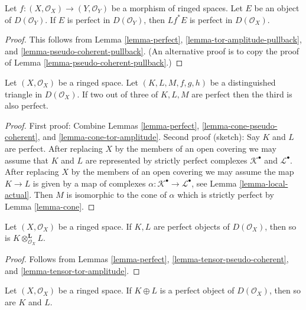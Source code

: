 \begin{lemma}
\label{lemma-perfect-pullback}
Let $f : (X, \mathcal{O}_X) \to (Y, \mathcal{O}_Y)$ be a morphism of ringed
spaces. Let $E$ be an object of $D(\mathcal{O}_Y)$. If $E$ is perfect in
$D(\mathcal{O}_Y)$, then $Lf^*E$ is perfect in $D(\mathcal{O}_X)$.
\end{lemma}

\begin{proof}
This follows from Lemma \ref{lemma-perfect},
\ref{lemma-tor-amplitude-pullback}, and
\ref{lemma-pseudo-coherent-pullback}.
(An alternative proof is to copy the proof of
Lemma \ref{lemma-pseudo-coherent-pullback}.)
\end{proof}

\begin{lemma}
\label{lemma-two-out-of-three-perfect}
Let $(X, \mathcal{O}_X)$ be a ringed space. Let $(K, L, M, f, g, h)$
be a distinguished triangle in $D(\mathcal{O}_X)$. If two out of three of
$K, L, M$ are perfect then the third is also perfect.
\end{lemma}

\begin{proof}
First proof: Combine
Lemmas \ref{lemma-perfect}, \ref{lemma-cone-pseudo-coherent}, and
\ref{lemma-cone-tor-amplitude}.
Second proof (sketch): Say $K$ and $L$ are perfect. After replacing
$X$ by the members of an open covering we may assume that $K$ and $L$
are represented by strictly perfect complexes $\mathcal{K}^\bullet$
and $\mathcal{L}^\bullet$. After replacing $X$ by the members
of an open covering we may assume the map $K \to L$ is given by
a map of complexes $\alpha : \mathcal{K}^\bullet \to \mathcal{L}^\bullet$,
see Lemma \ref{lemma-local-actual}.
Then $M$ is isomorphic to the cone of $\alpha$ which is strictly
perfect by Lemma \ref{lemma-cone}.
\end{proof}

\begin{lemma}
\label{lemma-tensor-perfect}
Let $(X, \mathcal{O}_X)$ be a ringed space.
If $K, L$ are perfect objects of $D(\mathcal{O}_X)$, then
so is $K \otimes_{\mathcal{O}_X}^\mathbf{L} L$.
\end{lemma}

\begin{proof}
Follows from
Lemmas \ref{lemma-perfect}, \ref{lemma-tensor-pseudo-coherent}, and
\ref{lemma-tensor-tor-amplitude}.
\end{proof}

\begin{lemma}
\label{lemma-summands-perfect}
Let $(X, \mathcal{O}_X)$ be a ringed space.
If $K \oplus L$ is a perfect object of $D(\mathcal{O}_X)$, then
so are $K$ and $L$.
\end{lemma}

